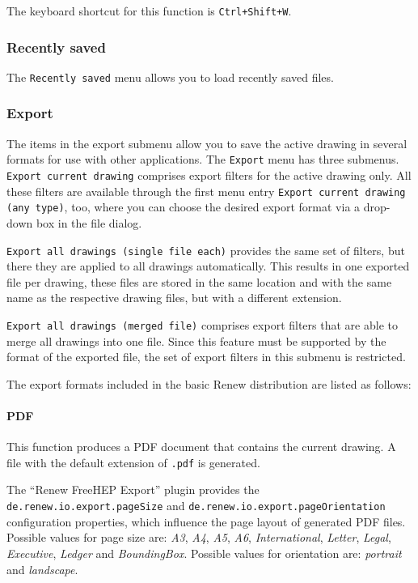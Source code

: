 The keyboard shortcut for this function is \texttt{Ctrl+Shift+W}.

\subsubsection{Recently saved}

The \texttt{Recently saved} menu allows you to load recently saved files.

\subsubsection{Export}

The items in the export submenu allow you to save the active drawing
in several formats for use with other applications.
The \texttt{Export} menu has three submenus.
\texttt{Export current drawing} comprises export filters for the
active drawing only.  
All these filters are available through the first menu entry
\texttt{Export current drawing (any type)}, too, where you can
choose the desired export format via a drop-down box in the file
dialog.

\texttt{Export all drawings (single file each)} provides the same
set of filters, but there they are applied to all drawings
automatically.
This results in one exported file per drawing, these files are
stored in the same location and with the same name as the respective
drawing files, but with a different extension.

\texttt{Export all drawings (merged file)} comprises export filters
that are able to merge all drawings into one file.
Since this feature must be supported by the format of the exported
file, the set of export filters in this submenu is restricted.

The export formats included in the basic Renew distribution are
listed as follows:

\paragraph{PDF}

This function produces a PDF document that contains the current drawing.
A file with the default extension of \texttt{.pdf} is generated.

The ``Renew FreeHEP Export'' plugin provides the
\texttt{de.renew.io.export.pageSize} and
\texttt{de.renew.io.export.pageOrientation} configuration properties, which
influence the page layout of generated PDF files.
Possible values for page size are: \emph{A3}, \emph{A4}, \emph{A5}, \emph{A6}, 
\emph{International}, \emph{Letter}, \emph{Legal}, \emph{Executive}, \emph{Ledger}
and \emph{BoundingBox}.
Possible values for orientation are: \emph{portrait} and \emph{landscape}.

